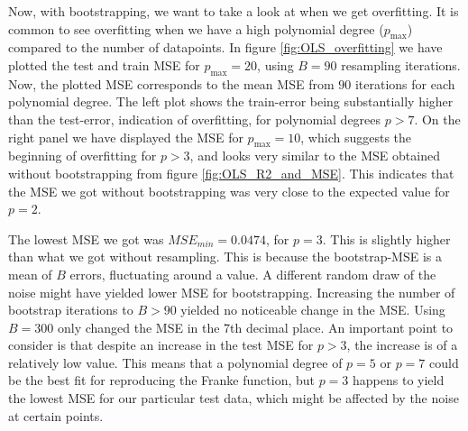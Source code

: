 \documentclass[reprint,english,notitlepage,aps,nobalancelastpage,nofootinbib]{revtex4-1}  %
\begin{document}
Now, with bootstrapping, we want to take a look at when we get overfitting. It is common to see overfitting when we have a high polynomial degree ($p_\text{max}$) compared to the number of datapoints. In figure \ref{fig:OLS_overfitting} we have plotted the test and train MSE for $p_\text{max} = 20$, using $B=90$ resampling iterations. Now, the plotted MSE corresponds to the mean MSE from $90$ iterations for each polynomial degree. The left plot shows the train-error being substantially higher than the test-error, indication of overfitting, for polynomial degrees $p > 7$. On the right panel we have displayed the MSE for $p_\text{max} = 10$, which suggests the beginning of overfitting for $p>3$, and looks very similar to the MSE obtained without bootstrapping from figure \ref{fig:OLS_R2_and_MSE}. This indicates that the MSE we got without bootstrapping was very close to the expected value for $p=2$.

The lowest MSE we got was $MSE_{min}=0.0474$, for $p=3$. This is slightly higher than what we got without resampling. This is because the bootstrap-MSE is a mean of $B$ errors, fluctuating around a value. A different random draw of the noise might have yielded lower MSE for bootstrapping. Increasing the number of bootstrap iterations to $B>90$ yielded no noticeable change in the MSE. Using $B=300$ only changed the MSE in the 7th decimal place. An important point to consider is that despite an increase in the test MSE for $p>3$, the increase is of a relatively low value. This means that a polynomial degree of $p=5$ or $p=7$ could be the best fit for reproducing the Franke function, but $p=3$ happens to yield the lowest MSE for our particular test data, which might be affected by the noise at certain points.
\end{document}
